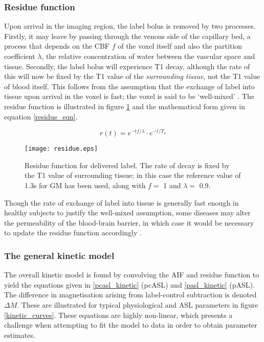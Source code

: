 \subsubsection{Residue function}

Upon arrival in the imaging region, the label bolus is removed by two processes. Firstly, it may leave by passing through the venous side of the capillary bed, a process that depends on the CBF $f$ of the voxel itself and also the partition coefficient $\lambda$, the relative concentration of water between the vascular space and tissue. Secondly, the label bolus will experience T1 decay, although the rate of this will now be fixed by the T1 value of the \textit{surrounding tissue}, not the T1 value of blood itself. This follows from the assumption that the exchange of label into tissue upon arrival in the voxel is fast; the voxel is said to be `well-mixed' \cite{Buxton1998}. The residue function is illustrated in figure \ref{residue_fig} and the mathematical form given in equation \ref{residue_eqn}. 

\begin{equation}
r(t) = e^{-tf/\lambda} \cdot e^{-t/T_{1}}
\label{residue_eqn}
\end{equation}

\begin{figure}[H]
\centering
\texttt{[image: residue.eps]}
\caption{Residue function for delivered label. The rate of decay is fixed by the T1 value of surrounding tissue; in this case the reference value of 1.3s for GM has been used, along with $f =$ 1 and $\lambda =$ 0.9.}
\label{residue_fig}
\end{figure}

Though the rate of exchange of label into tissue is generally fast enough in healthy subjects to justify the well-mixed assumption, some diseases may alter the permeability of the blood-brain barrier, in which case it would be necessary to update the residue function accordingly \cite{asl_primer}. 

\subsubsection{The general kinetic model}

The overall kinetic model is found by convolving the AIF and residue function to yield the equations given in \ref{pcasl_kinetic} (pcASL) and \ref{pasl_kinetic} (pASL). The difference in magnetisation arising from label-control subtraction is denoted $\Delta M$. These are illustrated for typical physiological and ASL parameters in figure \ref{kinetic_curves}. These equations are highly non-linear, which presents a challenge when attempting to fit the model to data in order to obtain parameter estimates. 

